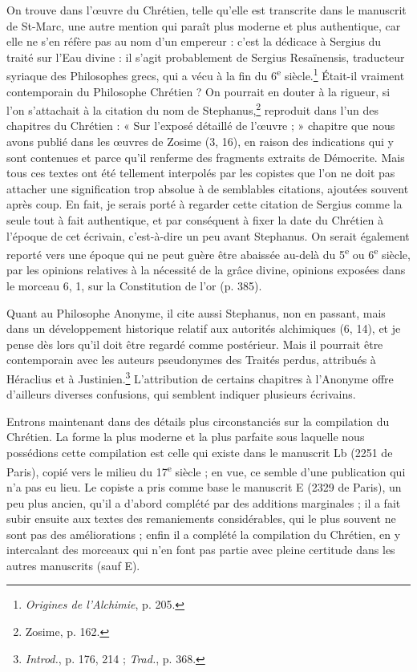 \documentclass[a4paper, 11pt, oneside, polutonikogreek, french]{article}
\begin{document}
On trouve dans l'œuvre du Chrétien, telle qu'elle est transcrite dans le manuscrit de St-Marc, une autre mention qui paraît plus moderne et plus authentique, car elle ne s'en réfère pas au nom d'un empereur : c'est la dédicace à Sergius du traité sur l'Eau divine : il s'agit probablement de Sergius Resaïnensis, traducteur syriaque des Philosophes grecs, qui a vécu à la fin du 6\textsuperscript{e} siècle.\footnote{\emph{Origines de l'Alchimie}, p. 205.} Était-il vraiment contemporain du Philosophe Chrétien ? On pourrait en douter à la rigueur, si l'on s'attachait à la citation du nom de Stephanus,\footnote{Zosime, p. 162.} reproduit dans l'un des chapitres du Chrétien : « Sur l'exposé détaillé de l'œuvre ; » chapitre que nous avons publié dans les œuvres de Zosime (3, 16), en raison des indications qui y sont contenues et parce qu'il renferme des fragments extraits de Démocrite. Mais tous ces textes ont été tellement interpolés par les copistes que l'on ne doit pas attacher une signification trop absolue à de semblables citations, ajoutées souvent après coup. En fait, je serais porté à regarder cette citation de Sergius comme la seule tout à fait authentique, et par conséquent à fixer la date du Chrétien à l'époque de cet écrivain, c'est-à-dire un peu avant Stephanus. On serait également reporté vers une époque qui ne peut guère être abaissée au-delà du 5\textsuperscript{e} ou 6\textsuperscript{e} siècle, par les opinions relatives à la nécessité de la grâce divine, opinions exposées dans le morceau 6, 1, sur la Constitution de l'or (p. 385).

Quant au Philosophe Anonyme, il cite aussi Stephanus, non en passant, mais dans un développement historique relatif aux autorités alchimiques (6, 14), et je pense dès lors qu'il doit être regardé comme postérieur. Mais il pourrait être contemporain avec les auteurs pseudonymes des Traités perdus, attribués à Héraclius et à Justinien.\footnote{\emph{Introd.}, p. 176, 214 ; \emph{Trad.}, p. 368.} L'attribution de certains chapitres à l'Anonyme offre d'ailleurs diverses confusions, qui semblent indiquer plusieurs écrivains.

Entrons maintenant dans des détails plus circonstanciés sur la compilation du Chrétien. La forme la plus moderne et la plus parfaite sous laquelle nous possédions cette compilation est celle qui existe dans le manuscrit Lb (2251 de Paris), copié vers le milieu du 17\textsuperscript{e} siècle ; en vue, ce semble d'une publication qui n'a pas eu lieu. Le copiste a pris comme base le manuscrit E (2329 de Paris), un peu plus ancien, qu'il a d'abord complété par des additions marginales ; il a fait subir ensuite aux textes des remaniements considérables, qui le plus souvent ne sont pas des améliorations ; enfin il a complété la compilation du Chrétien, en y intercalant des morceaux qui n'en font pas partie avec pleine certitude dans les autres manuscrits (sauf E).
\end{document}
